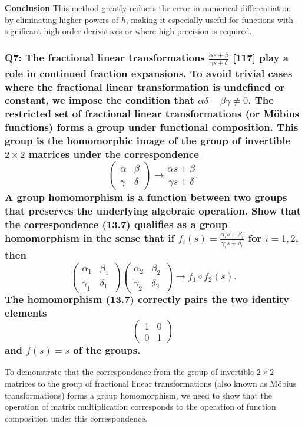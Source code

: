 \documentclass[8pt]{article}
\begin{document}
\textbf{Conclusion}
This method greatly reduces the error in numerical differentiation by eliminating higher powers of \( h \), making it especially useful for functions with significant high-order derivatives or where high precision is required.

\subsubsection*{Q7: The fractional linear transformations \( \frac{\alpha s + \beta}{\gamma s + \delta} \) [117] play a role in continued fraction expansions. To avoid trivial cases where the fractional linear transformation is undefined or constant, we impose the condition that \( \alpha \delta - \beta \gamma \neq 0 \). The restricted set of fractional linear transformations (or Möbius functions) forms a group under functional composition. This group is the homomorphic image of the group of invertible \( 2 \times 2 \) matrices under the correspondence
\[
\begin{pmatrix}
\alpha & \beta \\
\gamma & \delta
\end{pmatrix}
\longrightarrow \frac{\alpha s + \beta}{\gamma s + \delta}.
\]
A group homomorphism is a function between two groups that preserves the underlying algebraic operation. Show that the correspondence (13.7) qualifies as a group homomorphism in the sense that if \( f_i(s) = \frac{\alpha_i s + \beta_i}{\gamma_i s + \delta_i} \) for \( i = 1, 2 \), then
\[
\begin{pmatrix}
\alpha_1 & \beta_1 \\
\gamma_1 & \delta_1
\end{pmatrix}
\begin{pmatrix}
\alpha_2 & \beta_2 \\
\gamma_2 & \delta_2
\end{pmatrix}
\longrightarrow f_1 \circ f_2(s).
\]
The homomorphism (13.7) correctly pairs the two identity elements 
\[
\begin{pmatrix}
1 & 0 \\
0 & 1
\end{pmatrix}
\]
and \( f(s) = s \) of the groups.}

To demonstrate that the correspondence from the group of invertible \(2 \times 2\) matrices to the group of fractional linear transformations (also known as Möbius transformations) forms a group homomorphism, we need to show that the operation of matrix multiplication corresponds to the operation of function composition under this correspondence. 
\end{document}
